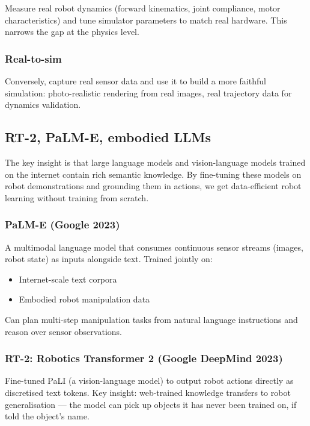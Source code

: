 Measure real robot dynamics (forward kinematics, joint compliance, motor characteristics) and tune simulator parameters to match real hardware. This narrows the gap at the physics level.

\subsubsection{Real-to-sim}

Conversely, capture real sensor data and use it to build a more faithful simulation: photo-realistic rendering from real images, real trajectory data for dynamics validation.

\subsection{RT-2, PaLM-E, embodied LLMs}

\begin{intuitionbox}
The key insight is that large language models and vision-language models trained on the internet contain rich semantic knowledge. By fine-tuning these models on robot demonstrations and grounding them in actions, we get data-efficient robot learning without training from scratch.
\end{intuitionbox}

\subsubsection{PaLM-E (Google 2023)}

A multimodal language model that consumes continuous sensor streams (images, robot state) as inputs alongside text. Trained jointly on:
\begin{itemize}
\item Internet-scale text corpora
\item Embodied robot manipulation data
\end{itemize}

Can plan multi-step manipulation tasks from natural language instructions and reason over sensor observations.

\subsubsection{RT-2: Robotics Transformer 2 (Google DeepMind 2023)}

Fine-tuned PaLI (a vision-language model) to output robot actions directly as discretised text tokens. Key insight: web-trained knowledge transfers to robot generalisation — the model can pick up objects it has never been trained on, if told the object's name.

